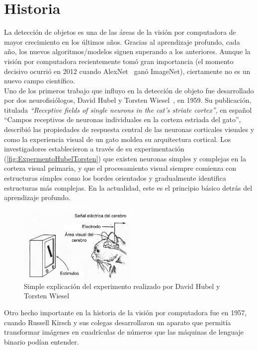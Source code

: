 \section{Historia} \label{sec:historia}
La detección de objetos es una de las áreas de la visión por computadora de mayor crecimiento en los últimos años. Gracias al aprendizaje profundo, cada año, los nuevos algoritmos/modelos siguen superando a los anteriores. Aunque la visión por computadora recientemente tomó gran importancia (el momento decisivo ocurrió en 2012 cuando AlexNet~\cite{krizhevsky2012imagenet} ganó ImageNet), ciertamente no es un nuevo campo científico.\\

Uno de los primeros trabajo que influyo en la detección de objeto fue desarrollado por dos neurofisiólogos, David Hubel y Torsten Wiesel~\cite{hubel1959receptive}, en 1959. Su publicación, titulada \textit{``Receptive fields of single neurons in the cat’s striate cortex''}, en español ``Campos receptivos de neuronas individuales en la corteza estriada del gato'', describió las propiedades de respuesta central de las neuronas corticales visuales y como la experiencia visual de un gato moldea su arquitectura cortical. Los investigadores establecieron a través de su experimentación (\autoref{fig:ExpermentoHubelTorsten}) que existen neuronas simples y complejas en la corteza visual primaria, y que el procesamiento visual siempre comienza con estructuras simples como los bordes orientados y gradualmente identifica estructuras más complejas. En la actualidad, este es el principio básico detrás del aprendizaje profundo.\\

\begin{figure}
	\centering
	\includegraphics[width=0.5\textwidth]{img/cat.jpg}
	\caption{Simple explicación del experimento realizado por David Hubel y Torsten Wiesel}
	\label{fig:ExpermentoHubelTorsten}
\end{figure}

Otro hecho importante en la historia de la visión por computadora fue en 1957, cuando Russell Kirsch y sus colegas desarrollaron un aparato que permitía transformar imágenes en cuadrículas de números que las máquinas de lenguaje binario podían entender. 

